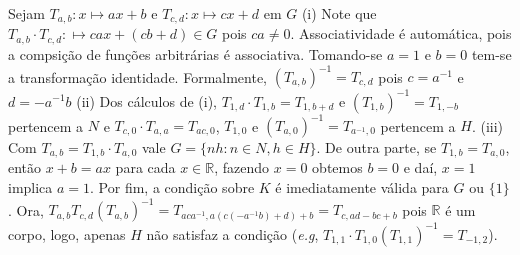 \begin{exemplo}
\begin{enumerate}[left=0.5cm, align=left, nosep]
        Sejam $T_{a,b} : x \mapsto ax + b$ e $T_{c,d} : x \mapsto cx + d$ em $G$ (i) Note que $T_{a,b} \cdot T_{c,d} : \mapsto
        cax + (cb + d) \in G$ pois $ca \neq 0$. Associatividade é automática, pois a compsição de funções arbitrárias é associativa.
        Tomando-se $a=1$ e $b=0$ tem-se a transformação identidade. Formalmente, $(T_{a,b})^{-1} = T_{c,d}$ pois $c = a^{-1}$ e $d = -a^{-1}b$
        (ii) Dos cálculos de (i), $ T_{1,d} \cdot T_{1,b} = T_{1,b+d}$ e $(T_{1,b})^{-1} = T_{1,-b}$ pertencem a $N$ e $T_{c,0} \cdot 
        T_{a,a} = T_{ac,0}$, $T_{1,0}$ e $(T_{a,0})^{-1} = T_{a^{-1},0}$ pertencem a $H$. 
        (iii) Com $T_{a,b} = T_{1,b} \cdot T_{a,0}$ vale $G = \{nh : n \in N, h \in H\}$. De outra parte, se $T_{1,b} = T_{a,0}$, 
        então $x + b = ax$ para cada $x \in \mathbb{R}$, fazendo $x = 0$ obtemos $b = 0$ e daí, $x = 1$ implica $a = 1$. 
        Por fim, a condição sobre $K$ é imediatamente válida para $G$ ou $\{1\}$. Ora, $T_{a,b} T_{c,d} (T_{a,b})^{-1} = T_{aca^{-1}, 
        a(c(-a^{-1}b) + d)+ b} = T_{c,ad-bc + b}$ pois $\mathbb{R}$ é um corpo, logo, apenas $H$ não satisfaz a condição (\emph{e.g},
        $T_{1,1} \cdot T_{1,0} (T_{1,1})^{-1} = T_{-1,2}$).
    \end{enumerate}

\end{exemplo}
